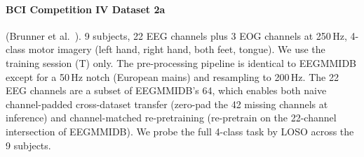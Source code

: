 \paragraph{BCI Competition IV Dataset 2a} (Brunner et
al.~\cite{bciiv2a}). 9 subjects, 22 EEG channels plus 3 EOG channels at
250\,Hz, 4-class motor imagery (left hand, right hand, both feet, tongue).
We use the training session (T) only. The pre-processing pipeline is
identical to EEGMMIDB except for a 50\,Hz notch (European mains) and
resampling to 200\,Hz. The 22 EEG channels are a subset of EEGMMIDB's 64,
which enables both naive channel-padded cross-dataset transfer (zero-pad
the 42 missing channels at inference) and channel-matched re-pretraining
(re-pretrain on the 22-channel intersection of EEGMMIDB). We probe the
full 4-class task by LOSO across the 9 subjects.
